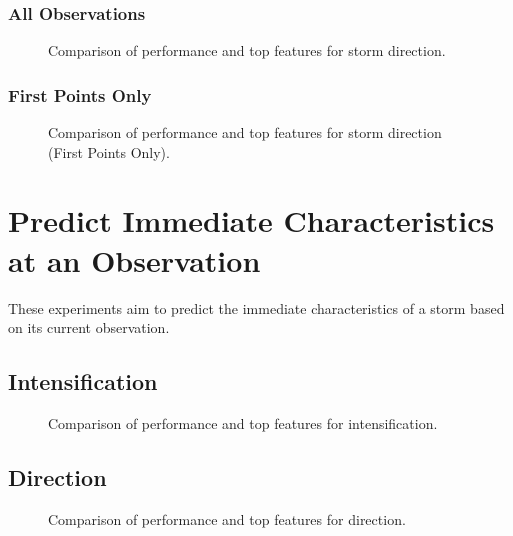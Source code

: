 \subsubsection{All Observations}

\begin{figure}[h]
    \centering
    \caption{Comparison of performance and top features for storm direction.}
    \label{fig:storm_direction_summary}
\end{figure}

\subsubsection{First Points Only}

\begin{figure}[h]
    \centering
    \caption{Comparison of performance and top features for storm direction (First Points Only).}
    \label{fig:storm_direction_first_points_summary}
\end{figure}

\section{Predict Immediate Characteristics at an Observation}

These experiments aim to predict the immediate characteristics of a storm based on its current observation.

\subsection{Intensification}

\begin{figure}[h]
    \centering
    \caption{Comparison of performance and top features for intensification.}
    \label{fig:obs_intensification_summary}
\end{figure}

\subsection{Direction}

\begin{figure}[h]
    \centering
    \caption{Comparison of performance and top features for direction.}
    \label{fig:obs_direction_summary}
\end{figure}

